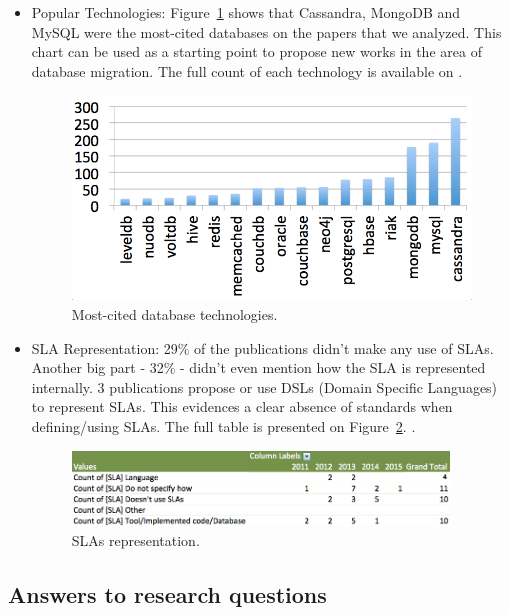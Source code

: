 \documentclass[a4paper]{IEEEtran}
\begin{document}
\begin{itemize}
\item{Popular Technologies: }
Figure~\ref{fig:mostCitedDB} shows that Cassandra, MongoDB and MySQL were the most-cited databases on the papers that we analyzed. This chart can be used as a starting point to propose new works in the area of database migration. The full count of each technology is available on \cite{fullDBJson}.
\begin{figure}%
\centering
\includegraphics[width=120mm]{db-graph.png}
\caption{Most-cited database technologies. \label{fig:mostCitedDB}}
\end{figure}

\item{SLA Representation: }
29\% of the publications didn't make any use of SLAs. Another big part - 32\% - didn't even mention how the SLA is represented internally. 3 publications propose or use DSLs (Domain Specific Languages) to represent SLAs. This evidences a clear absence of standards when defining/using SLAs. The full table is presented on Figure~\ref{fig:slaRepresentation}. \cite{fullDBJson}.
\begin{figure}%
\centering
\includegraphics[width=100mm]{graph4.png}
\caption{SLAs representation.\label{fig:slaRepresentation}}
\end{figure}



\end{itemize}



\subsection{Answers to research questions}
\end{document}
